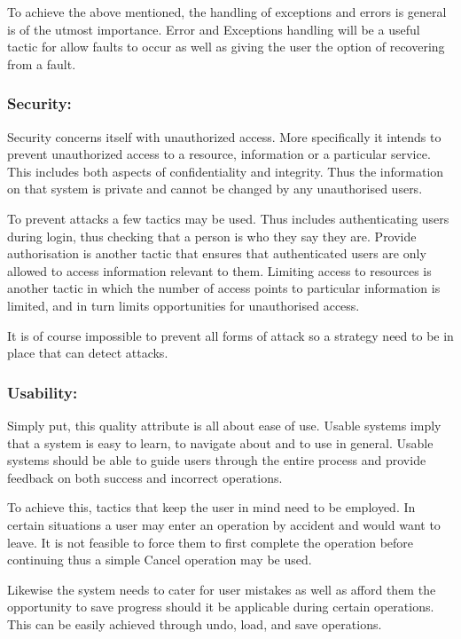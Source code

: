 \documentclass[a4paper,12pt]{article}
\begin{document}
\begin{flushleft}
	To achieve the above mentioned, the handling of exceptions and errors is general is of the utmost importance. Error and Exceptions handling will be a useful tactic for allow faults to occur as well as giving the user the option of recovering from a fault.

	\subsubsection{Security:}	
	Security concerns itself with unauthorized access. More specifically it intends to prevent unauthorized access to a resource, information or a particular service. This includes both aspects of confidentiality and integrity. Thus the information on that system is private and cannot be changed by any unauthorised users.
	
	To prevent attacks a few tactics may be used. Thus includes authenticating users during login, thus checking that a person is who they say they are. Provide authorisation is another tactic that ensures that authenticated users are only allowed to access information relevant to them. Limiting access to resources is another tactic in which the number of access points to particular information is limited, and in turn limits opportunities for unauthorised access.
	
	It is of course impossible to prevent all forms of attack so a strategy need to be in place that can detect attacks. 

	\subsubsection{Usability:}
	Simply put, this quality attribute is all about ease of use. Usable systems imply that a system is easy to learn, to navigate about and to use in general. Usable systems should be able to guide users through the entire process and provide feedback on both success and incorrect operations.
	
	To achieve this, tactics that keep the user in mind need to be employed. In certain situations a user may enter an operation by accident and would want to leave. It is not feasible to force them to first complete the operation before continuing thus a simple Cancel operation may be used. 
	
	Likewise the system needs to cater for user mistakes as well as afford them the opportunity to save progress should it be applicable during certain operations. This can be easily achieved through undo, load, and save operations. 
	

\end{flushleft}
\end{document}
